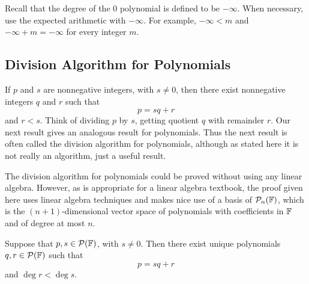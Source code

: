 %
Recall that the degree of the $0$ polynomial is defined to be $-\infty$. When
necessary, use the expected arithmetic with $-\infty$. For example,
$-\infty<m$ and $-\infty+m=-\infty$ for every integer $m$.

\subsection{Division Algorithm for Polynomials}

If $p$ and $s$ are nonnegative integers, with $s\ne0$, then there exist
nonnegative integers $q$ and $r$ such that
\[ p = sq+r \]
and $r<s$. Think of dividing $p$ by $s$, getting quotient $q$ with remainder
$r$. Our next result gives an analogous result for polynomials. Thus the next
result is often called the division algorithm for polynomials, although as
stated here it is not really an algorithm, just a useful result.

%
The division algorithm for polynomials could be proved without using any linear
algebra. However, as is appropriate for a linear algebra textbook, the proof
given here uses linear algebra techniques and makes nice use of a basis of
$\mathcal{P}_n(\mathbb{F})$, which is the $(n+1)$-dimensional vector space of polynomials
with coefficients in $\mathbb{F}$ and of degree at most $n$.

\begin{result}\label{ax:4.9}
Suppose that $p,s\in\mathcal{P}(\mathbb{F})$, with $s\ne0$. Then there exist unique
polynomials $q,r\in\mathcal{P}(\mathbb{F})$ such that
\[ p = sq+r \]
and $\deg r<\deg s$.
\end{result}

